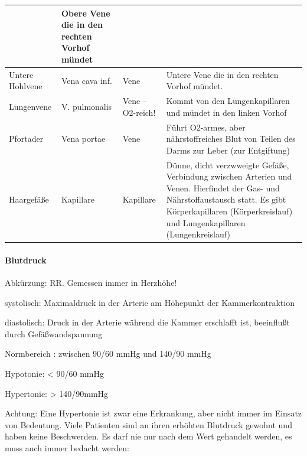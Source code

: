 \documentclass{article}
\begin{document}
\begin{center}
\begin{supertabular}{|m{2.728cm}|m{2.728cm}|m{2.728cm}|m{4.721cm}|}
 &
Obere Vene die in den rechten Vorhof m\"undet

\\\hline
Untere Hohlvene

 &
Vena cava inf.

 &
Vene

 &
Untere Vene die in den rechten Vorhof m\"undet. 

\\\hline
Lungenvene

 &
V. pulmonalis

 &
Vene -- O2{}-reich! 

 &
Kommt von den Lungenkapillaren und m\"undet in den linken Vorhof

\\\hline
Pfortader

 &
Vena portae

 &
Vene

 &
F\"uhrt O2-armes, aber n\"ahrstoffreiches Blut von Teilen des Darms zur
Leber (zur Entgiftung)

\\\hline
Haargef\"a{\ss}e

 &
Kapillare

 &
Kapillare

 &
D\"unne, dicht verzwweigte Gef\"a{\ss}e, Verbindung zwischen Arterien
und Venen. Hierfindet der Gas- und N\"ahrstoffaustausch statt. Es gibt
K\"orperkapillaren (K\"orperkreislauf) und Lungenkapillaren
(Lungenkreislauf)

\\\hline
\end{supertabular}
\end{center}
\paragraph{Blutdruck }
Abk\"urzung: RR. Gemessen immer in Herzh\"ohe!

systolisch:  Maximaldruck in der Arterie am H\"ohepunkt der
Kammerkontraktion

diastolisch: Druck in der Arterie w\"ahrend die Kammer erschlafft ist,
beeinflu{\ss}t durch  Gef\"a{\ss}wandspannung

Normbereich : zwischen 90/60 mmHg und 140/90 mmHg  

Hypotonie:  {\textless} 90/60 mmHg

Hypertonie: {\textgreater} 140/90mmHg  

Achtung: Eine Hypertonie ist zwar eine Erkrankung, aber nicht immer im
Einsatz von Bedeutung. Viele Patienten sind an ihren erh\"ohten
Blutdruck gewohnt und haben keine Beschwerden. Es darf nie nur nach dem
Wert gehandelt werden, es muss auch immer bedacht werden: 
\end{document}
